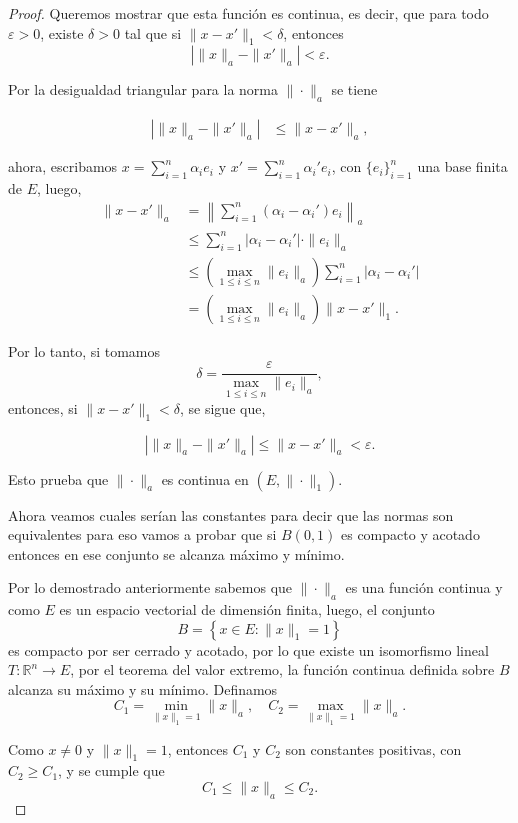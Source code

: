 \begin{enumerate}
\begin{proof}
Queremos mostrar que esta función es continua, es decir, que para todo $\varepsilon > 0$, existe $\delta > 0$ tal que si $\|x - x'\|_1 < \delta$, entonces 
\[
|\|x\|_a - \|x'\|_a| < \varepsilon.
\]

Por la desigualdad triangular para la norma $\|\cdot\|_a$ se tiene

\begin{align*}
\left| \|x\|_a - \|x'\|_a \right| 
&\leq \|x - x'\|_a,
\end{align*}

ahora, escribamos $x = \sum_{i=1}^n \alpha_i e_i$ y $x' = \sum_{i=1}^n \alpha_i' e_i$, con $\{e_i\}_{i=1}^n$ una base finita de $E$, luego,
\begin{align*}
\|x - x'\|_a &= \left\| \sum_{i=1}^n (\alpha_i - \alpha_i') e_i \right\|_a \\
&\leq \sum_{i=1}^n |\alpha_i - \alpha_i'| \cdot \|e_i\|_a \\
&\leq \left( \max_{1 \leq i \leq n} \|e_i\|_a \right) \sum_{i=1}^n |\alpha_i - \alpha_i'| \\
&= \left( \max_{1 \leq i \leq n} \|e_i\|_a \right) \|x - x'\|_1.
\end{align*}

Por lo tanto, si tomamos 
\[
\delta = \frac{\varepsilon}{\max_{1 \leq i \leq n} \|e_i\|_a},
\]
entonces, si $\|x - x'\|_1 < \delta$, se sigue que,

\[
|\|x\|_a - \|x'\|_a| \leq \|x - x'\|_a < \varepsilon.
\]

Esto prueba que $\|\cdot\|_a$ es continua en $(E, \|\cdot\|_1)$.


Ahora veamos cuales serían las constantes para decir que las normas son equivalentes para eso vamos a probar que si $B(0,1)$ es compacto y acotado entonces en ese conjunto se alcanza máximo y mínimo.

Por lo demostrado anteriormente sabemos que $\|\cdot\|_a$ es una función continua y como $E$ es un espacio vectorial de dimensión finita, luego, el conjunto
\[
B = \left\{ x \in E : \|x\|_1 = 1 \right\}
\]
es compacto por ser cerrado y acotado, por lo que existe un isomorfismo lineal $T : \mathbb{R}^n \to E$, por el teorema del valor extremo, la función continua definida sobre $B$ alcanza su máximo y su mínimo. Definamos
\[
C_1 = \min_{\|x\|_1 = 1} \|x\|_a, \quad C_2 = \max_{\|x\|_1 = 1} \|x\|_a.
\]

Como $x \neq 0$ y $\|x\|_1 = 1$, entonces $C_1$ y $C_2$ son constantes positivas, con $C_2 \geq C_1$, y se cumple que
\[
C_1 \leq \|x\|_a \leq C_2.
\]


\end{proof}
\end{enumerate}
